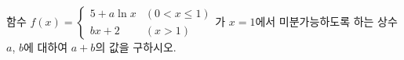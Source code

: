 함수 $f(x)=\begin{cases} 5+a\ln x & (0<x\le 1) \\ bx+2 & (x>1) \end{cases}$가 $x=1$에서 미분가능하도록 하는 상수 $a$, $b$에 대하여 $a+b$의 값을 구하시오.
